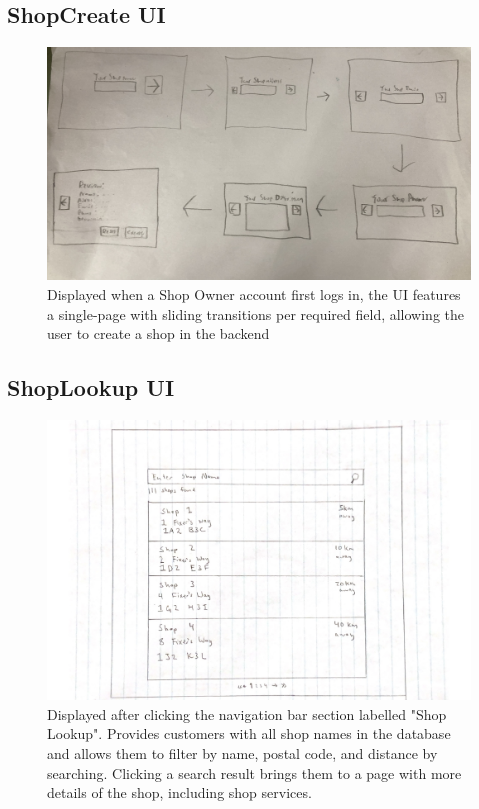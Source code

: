 \documentclass[12pt, titlepage]{article}
\begin{document}
\subsection{ShopCreate UI}
\begin{figure}[H]
    \centering
    \includegraphics[width=\textwidth]{Design/SystDesign/ui_ShopCreate.jpeg}
    \caption{Displayed when a Shop Owner account first logs in, the UI features a single-page with sliding transitions per required field, allowing the user to create a shop in the backend}
    \label{fig:ShopCreateUI}
\end{figure}

\subsection{ShopLookup UI}
\begin{figure}[H]
    \centering
    \includegraphics[width=\textwidth]{Design/SystDesign/ui_lookup.jpg}
    \caption{Displayed after clicking the navigation bar section labelled "Shop Lookup". Provides customers with all shop names in the database and allows them to filter by name, postal code, and distance by searching. Clicking a search result brings them to a page with more details of the shop, including shop services.}
    \label{fig:shopLookupUI}
\end{figure}
\end{document}
